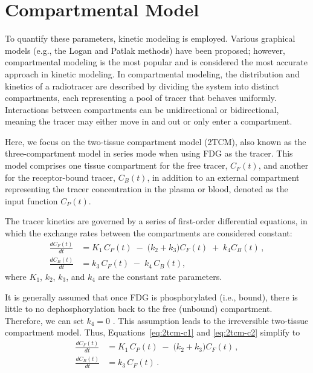 \section{Compartmental Model}
To quantify these parameters, kinetic modeling is employed.
Various graphical models (e.g., the Logan \cite{TODO} and Patlak \cite{TODO} methods) have been proposed; however, compartmental modeling is the most popular and is considered the most accurate approach in kinetic modeling.
In compartmental modeling, the distribution and kinetics of a radiotracer are described by dividing the system into distinct compartments, each representing a pool of tracer that behaves uniformly.
Interactions between compartments can be unidirectional or bidirectional, meaning the tracer may either move in and out or only enter a compartment.

Here, we focus on the two-tissue compartment model (2TCM), also known as the three-compartment model in series mode when using FDG as the tracer.
This model comprises one tissue compartment for the free tracer, \(C_F(t)\), and another for the receptor-bound tracer, \(C_B(t)\), in addition to an external compartment representing the tracer concentration in the plasma or blood, denoted as the input function \(C_P(t)\).

The tracer kinetics are governed by a series of first-order differential equations, in which the exchange rates between the compartments are considered constant:
\begin{align}
	\frac{dC_F(t)}{dt} & = K_1 \, C_P(t) \;-\; \bigl(k_2 + k_3\bigr) C_F(t) \;+\; k_4 C_B(t) \,, \label{eq:2tcm-c1} \\[6pt]
	\frac{dC_B(t)}{dt} & = k_3 \, C_F(t) \;-\; k_4 \, C_B(t), \label{eq:2tcm-c2}
\end{align}
where \(K_1\), \(k_2\), \(k_3\), and \(k_4\) are the constant rate parameters.

It is generally assumed that once FDG is phosphorylated (i.e., bound), there is little to no dephosphorylation back to the free (unbound) compartment.
Therefore, we can set \(k_4 = 0\) \cite{TODO}.
This assumption leads to the irreversible two-tissue compartment model.
Thus, Equations~\eqref{eq:2tcm-c1} and \eqref{eq:2tcm-c2} simplify to
\begin{align}
	\frac{dC_F(t)}{dt} & = K_1 \, C_P(t) \;-\; \bigl(k_2 + k_3\bigr) C_F(t) \,, \\[6pt]
	\frac{dC_B(t)}{dt} & = k_3 \, C_F(t) \,.
\end{align}

